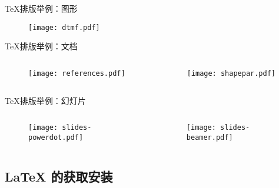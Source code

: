 \begin{frame}{\TeX{}排版举例：图形}
\begin{minipage}[t]{0.5\linewidth}
    \begin{figure}[h]
      \centering
      \texttt{[image: dtmf.pdf]}
    \end{figure}
  \end{minipage}
\end{frame}

\begin{frame}{\TeX{}排版举例：文档}
  \begin{columns}
    \begin{column}{.45\textwidth}
      \begin{figure}[h]
        \centering
        \texttt{[image: references.pdf]}
      \end{figure}
    \end{column}
    \begin{column}{.45\textwidth}
      \begin{figure}[h]
        \centering
        \texttt{[image: shapepar.pdf]}
      \end{figure}
    \end{column}
  \end{columns}
\end{frame}

\begin{frame}{\TeX{}排版举例：幻灯片}
  \begin{columns}
    \begin{column}{.45\textwidth}
      \begin{figure}[h]
        \centering
        \texttt{[image: slides-powerdot.pdf]}
      \end{figure}
    \end{column}
    \begin{column}{.45\textwidth}
      \begin{figure}[h]
        \centering
        \texttt{[image: slides-beamer.pdf]}
      \end{figure}
    \end{column}
  \end{columns}
\end{frame}

\subsection{\LaTeX{} 的获取安装}

  
